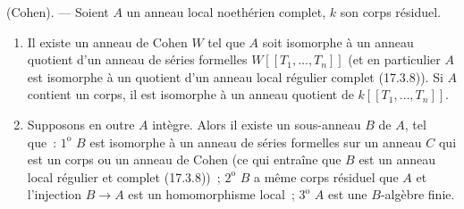 \begin{theorem}[19.8.8]
\label{0.19.8.8-fr}
\textup{(Cohen).} --- Soient $A$ un anneau local noethérien complet, $k$ son
corps résiduel.


\begin{enumerate}
  \item[(i)] Il existe un anneau de Cohen $W$ tel que $A$ soit isomorphe à un
  anneau quotient d'un anneau de séries formelles
  $W[[T_1,\ldots,T_n]]$ (et en particulier $A$ est isomorphe à un quotient d'un
  anneau local régulier complet (17.3.8)). Si $A$ contient un corps, il est
  isomorphe à un anneau quotient de $k[[T_1,\ldots,T_n]]$.
  \item[(ii)] Supposons en outre $A$ intègre. Alors il existe un sous-anneau
  $B$ de $A$, tel que~: $1^{\mathrm o}$ $B$ est isomorphe à un anneau de séries
  formelles sur un anneau $C$ qui est un corps ou un anneau de Cohen (ce qui
  entraîne que $B$ est un anneau local régulier et complet (17.3.8))~;
  $2^{\mathrm o}$ $B$ a même corps résiduel que $A$ et l'injection $B\to A$ est
  un homomorphisme local~; $3^{\mathrm o}$ $A$ est une $B$-algèbre finie.
\end{enumerate}
\end{theorem}

